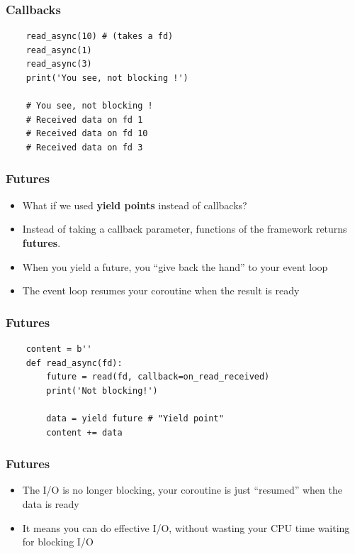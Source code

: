 \documentclass[ignorenonframetext,]{beamer}
\begin{document}
\begin{frame}[fragile]\frametitle{Callbacks}

\begin{verbatim}
    read_async(10) # (takes a fd)
    read_async(1)
    read_async(3)
    print('You see, not blocking !')

    # You see, not blocking !
    # Received data on fd 1
    # Received data on fd 10
    # Received data on fd 3
\end{verbatim}

\end{frame}

\begin{frame}[fragile]\frametitle{Futures}

\begin{itemize}[<+->]
\itemsep1pt\parskip0pt
\item
  What if we used \textbf{yield points} instead of callbacks?
\item
  Instead of taking a callback parameter, functions of the framework
  returns \textbf{futures}.
\item
  When you yield a future, you ``give back the hand'' to your event loop
\item
  The event loop resumes your coroutine when the result is ready
\end{itemize}

\end{frame}

\begin{frame}[fragile]\frametitle{Futures}

\begin{verbatim}
    content = b''
    def read_async(fd):
        future = read(fd, callback=on_read_received)
        print('Not blocking!')

        data = yield future # "Yield point"
        content += data
\end{verbatim}

\end{frame}

\begin{frame}[fragile]\frametitle{Futures}

\begin{itemize}[<+->]
\itemsep1pt\parskip0pt
\item
  The I/O is no longer blocking, your coroutine is just ``resumed'' when
  the data is ready
\item
  It means you can do effective I/O, without wasting your CPU time
  waiting for blocking I/O
\end{itemize}

\end{frame}
\end{document}
